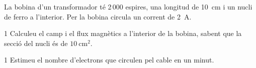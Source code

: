 La bobina d'un transformador té 2\,000 espires, una longitud de 10~cm i un nucli de ferro a l'interior. Per la bobina circula un corrent de 2~A.

\begin{apartat}{1}
Calculeu el camp i el flux magnètics a l'interior de la bobina, sabent que la secció del nucli és de $10\ \mathrm{cm^2}$.
\end{apartat}

\begin{apartat}{1}
Estimeu el nombre d'electrons que circulen pel cable en un minut.
\end{apartat}

